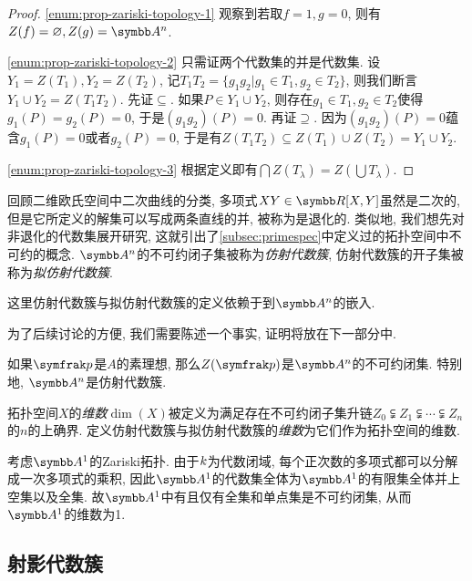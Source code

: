 \begin{proof}
    \ref{enum:prop-zariski-topology-1} 观察到若取$f=1, g=0$, 则有$Z(f)=\varnothing, Z(g)=\AF^n$.

    \ref{enum:prop-zariski-topology-2} 只需证两个代数集的并是代数集. 设$Y_1=Z(T_1), Y_2 = Z(T_2)$, 记$T_1T_2=\{g_1g_2\vert g_1\in T_1, g_2\in T_2\}$, 则我们断言$Y_1\cup Y_2 = Z(T_1T_2)$. 先证$\subseteq$. 如果$P\in Y_1\cup Y_2$, 则存在$g_1\in T_1, g_2\in T_2$使得$g_1(P)=g_2(P)=0$, 于是$(g_1g_2)(P)=0$. 再证$\supseteq$. 因为$(g_1g_2)(P)=0$蕴含$g_1(P)=0$或者$g_2(P)=0$, 于是有$Z(T_1T_2)\subseteq Z(T_1)\cup Z(T_2)=Y_1\cup Y_2$.

    \ref{enum:prop-zariski-topology-3} 根据定义即有$\bigcap Z(T_\lambda)=Z(\bigcup T_\lambda)$.
\end{proof}

回顾二维欧氏空间中二次曲线的分类, 多项式$XY\in \RR[X, Y]$虽然是二次的, 但是它所定义的解集可以写成两条直线的并, 被称为是退化的. 类似地, 我们想先对非退化的代数集展开研究, 这就引出了\ref{subsec:primespec}中定义过的拓扑空间中不可约的概念. $\AF^n$的不可约闭子集被称为\emph{仿射代数簇}, 仿射代数簇的开子集被称为\emph{拟仿射代数簇}.

\begin{remark}
    这里仿射代数簇与拟仿射代数簇的定义依赖于到$\AF^n$的嵌入.%
\end{remark}

为了后续讨论的方便, 我们需要陈述一个事实, 证明将放在下一部分中.

\begin{proposition}\label{prop:affineprimeirreducible}
    如果$\ideal{p}$是$A$的素理想, 那么$Z(\ideal{p})$是$\AF^n$的不可约闭集. 特别地, $\AF^n$是仿射代数簇.
\end{proposition}

拓扑空间$X$的\emph{维数}$\dim (X)$被定义为满足存在不可约闭子集升链$Z_0\subsetneqq Z_1\subsetneqq \dotsb \subsetneqq Z_n$的$n$的上确界. 定义仿射代数簇与拟仿射代数簇的\emph{维数}为它们作为拓扑空间的维数.

\begin{example}
    考虑$\AF^1$的Zariski拓扑. 由于$k$为代数闭域, 每个正次数的多项式都可以分解成一次多项式的乘积, 因此$\AF^1$的代数集全体为$\AF^1$的有限集全体并上空集以及全集. 故$\AF^1$中有且仅有全集和单点集是不可约闭集, 从而$\AF^1$的维数为1.
\end{example}

\subsection{射影代数簇}


